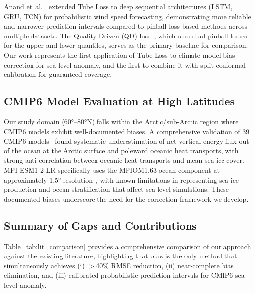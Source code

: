 \documentclass[conference]{IEEEtran}
\begin{document}
Anand et~al.~\cite{anand2024tube_wind} extended Tube Loss to deep sequential architectures (LSTM, GRU, TCN) for probabilistic wind speed forecasting, demonstrating more reliable and narrower prediction intervals compared to pinball-loss-based methods across multiple datasets. The Quality-Driven (QD) loss~\cite{pearce2018}, which uses dual pinball losses for the upper and lower quantiles, serves as the primary baseline for comparison. Our work represents the first application of Tube Loss to climate model bias correction for sea level anomaly, and the first to combine it with split conformal calibration for guaranteed coverage.

\subsection{CMIP6 Model Evaluation at High Latitudes}

Our study domain (60°--80°N) falls within the Arctic/sub-Arctic region where CMIP6 models exhibit well-documented biases. A comprehensive validation of 39 CMIP6 models~\cite{mayer2024} found systematic underestimation of net vertical energy flux out of the ocean at the Arctic surface and poleward oceanic heat transports, with strong anti-correlation between oceanic heat transports and mean sea ice cover. MPI-ESM1-2-LR specifically uses the MPIOM1.63 ocean component at approximately 1.5° resolution~\cite{wiese2024}, with known limitations in representing sea-ice production and ocean stratification that affect sea level simulations. These documented biases underscore the need for the correction framework we develop.

\subsection{Summary of Gaps and Contributions}

Table~\ref{tab:lit_comparison} provides a comprehensive comparison of our approach against the existing literature, highlighting that ours is the only method that simultaneously achieves (i) $>$40\% RMSE reduction, (ii) near-complete bias elimination, and (iii) calibrated probabilistic prediction intervals for CMIP6 sea level anomaly.
\end{document}
